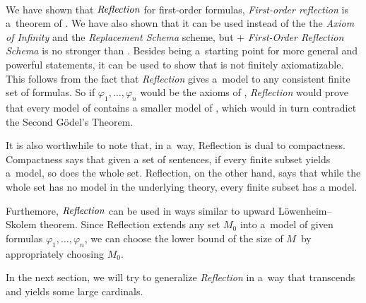 \


We have shown that $\emph{Reflection}$ for first-order formulas, \emph{First-order reflection} is a~theorem of . %
We have also shown that it can be used instead of the the \emph{Axiom of Infinity} and the \emph{Replacement Schema} scheme, but  + \emph{First-Order Reflection Schema} is no stronger than . Besides being a~starting point for more general and powerful statements, it can be used to show that  is not finitely axiomatizable. This follows from the fact that \emph{Reflection} gives a~model to any consistent finite set of formulas. 
So if $\varphi_1, \ldots, \varphi_n$ would be the axioms of , \emph{Reflection} would prove that every model of  contains a smaller model of , which would in turn contradict the Second Gödel's Theorem. %

It is also worthwhile to note that, in a~way, Reflection is dual to compactness. 
Compactness says that given a set of sentences, if every finite subset yields a~model, so does the whole set. Reflection, on the other hand, says that while the whole set has no model in the underlying theory, every finite subset has a model.

Furthemore, $\emph{Reflection}$ can be used in ways similar to upward Löwenheim–Skolem theorem.
Since Reflection extends any set $M_0$ into a~model of given formulas $\varphi_1, \ldots, \varphi_n$, we can choose the lower bound of the size of $M$ by appropriately choosing $M_0$.

In the next section, we will try to generalize \emph{Reflection} in a~way that transcends  and yields some large cardinals.
\newpage
